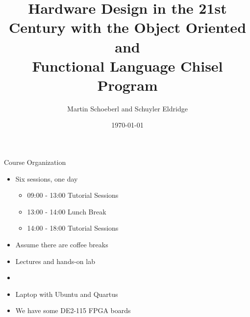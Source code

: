 

\newif\ifbook


\title{Hardware Design in the 21st Century with the Object Oriented
and\\
Functional Language Chisel\\Program}
\author{Martin Schoeberl and Schuyler Eldridge}
\date{\today}



\begin{frame}
\titlepage
\end{frame}


\begin{frame}[fragile]{Course Organization}
\begin{itemize}
\item Six sessions, one day
\begin{itemize}
\item	09:00 - 13:00	Tutorial Sessions
\item	13:00 - 14:00	Lunch Break
\item	14:00 - 18:00	Tutorial Sessions
\end{itemize}
\item Assume there are coffee breaks
\item Lectures and hands-on lab
\item 
\item Laptop with Ubuntu and Quartus
\item We have some DE2-115 FPGA boards
\end{itemize}
\end{frame}

